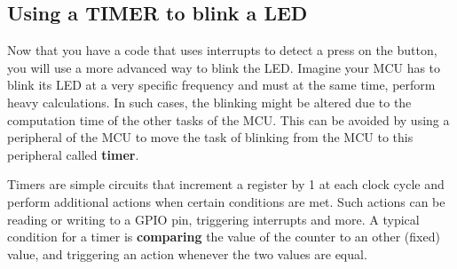 \subsection{Using a TIMER to blink a LED}
Now that you have a code that uses interrupts to detect a press on the button, you will use a more advanced way to blink the LED. Imagine your MCU has to blink its LED at a very specific frequency and must at the same time, perform heavy calculations. In such cases, the blinking might be altered due to the computation time of the other tasks of the MCU. This can be avoided by using a peripheral of the MCU to move the task of blinking from the MCU to this peripheral called \textbf{timer}.

Timers are simple circuits that increment a register by 1 at each clock cycle and perform additional actions when certain conditions are met. Such actions can be reading or writing to a GPIO pin, triggering interrupts and more. A typical condition for a timer is \textbf{comparing} the value of the counter to an other (fixed) value, and triggering an action whenever the two values are equal.

